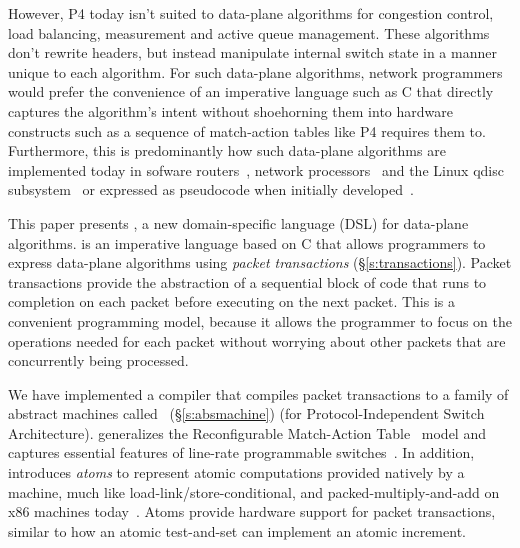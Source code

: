 However, P4 today isn't suited to data-plane algorithms for congestion control,
load balancing, measurement and active queue management. These algorithms don't
rewrite headers, but instead manipulate internal switch state in a manner
unique to each algorithm.  For such data-plane algorithms, network programmers
would prefer the convenience of an imperative language such as C that directly
captures the algorithm's intent without shoehorning them into hardware
constructs such as a sequence of match-action tables like P4 requires them to.
Furthermore, this is predominantly how such data-plane algorithms are
implemented today in sofware routers~\cite{click, dpdk, routebricks}, network
processors~\cite{packetc, nova} and the Linux qdisc subsystem~\cite{qdisc} or
expressed as pseudocode when initially developed~\cite{red, csfq, codel_code,
avq, blue}.

This paper presents \pktlanguage, a new domain-specific language (DSL) for
data-plane algorithms.  \pktlanguage is an imperative language based on C that
allows programmers to express data-plane algorithms using {\em packet
transactions} (\S\ref{s:transactions}).  Packet transactions provide the
abstraction of a sequential block of code that runs to completion on each
packet before executing on the next packet. This is a convenient programming
model, because it allows the programmer to focus on the operations needed for
each packet without worrying about other packets that are concurrently being processed.

We have implemented a \pktlanguage compiler that compiles packet transactions
to a family of abstract machines called \absmachine~(\S\ref{s:absmachine}) (for
Protocol-Independent Switch Architecture). \absmachine generalizes the
Reconfigurable Match-Action Table~\cite{rmt} model and captures essential
features of line-rate programmable switches~\cite{rmt, xpliant, flexpipe}. In
addition, \absmachine introduces {\em atoms} to represent atomic computations
provided natively by a \absmachine machine, much like
load-link/store-conditional, and packed-multiply-and-add on x86 machines
today~\cite{x86_manual}.  Atoms provide hardware support for packet
transactions, similar to how an atomic test-and-set can implement an atomic
increment.

